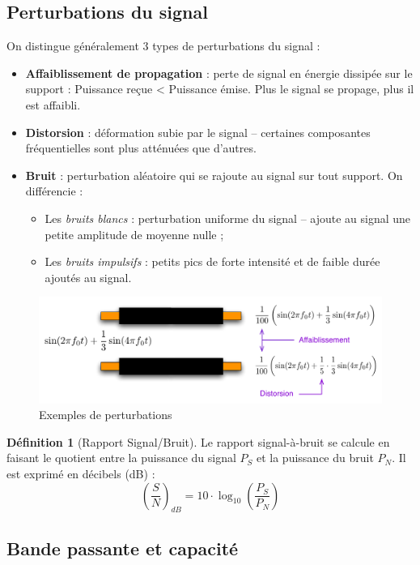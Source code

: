 \documentclass[11pt,english,french]{scrreprt}
\theoremstyle{remark}
\theoremstyle{definition}
\newtheorem*{def*}{Définition}
\begin{document}
\subsection{Perturbations du signal} %

On distingue généralement 3 types de perturbations du signal :\begin{itemize}
	\item \textbf{Affaiblissement de propagation} : perte de signal en énergie dissipée sur le support : Puissance reçue < Puissance émise. Plus le signal se propage, plus il est affaibli. 
	\item \textbf{Distorsion} : déformation subie par le signal -- certaines composantes fréquentielles sont plus atténuées que d'autres.
	\item \textbf{Bruit} : perturbation aléatoire qui se rajoute au signal sur tout support. On différencie :\begin{itemize}
		\item Les \emph{bruits blancs} : perturbation uniforme du signal -- ajoute au signal une petite amplitude de moyenne nulle ;
		\item Les \emph{bruits impulsifs} : petits pics de forte intensité et de faible durée ajoutés au signal.
	\end{itemize}
\end{itemize}

\begin{figure}[h!]
	\center
	\includegraphics[scale=.75]{graphes/perturbations}
	\caption{Exemples de perturbations}
\end{figure}

\begin{def*}[Rapport Signal/Bruit]
 	Le rapport signal-à-bruit se calcule en faisant le quotient entre la puissance du signal $P_S$ et la puissance du bruit $P_N$. Il est exprimé en décibels (dB) :
\[
	\left(\frac{S}{N}\right)_{dB}=10\cdot\log_{10}\left(\frac{P_{S}}{P_{N}}\right)
\]
\end{def*}

\subsection{Bande passante et capacité} %
\end{document}
